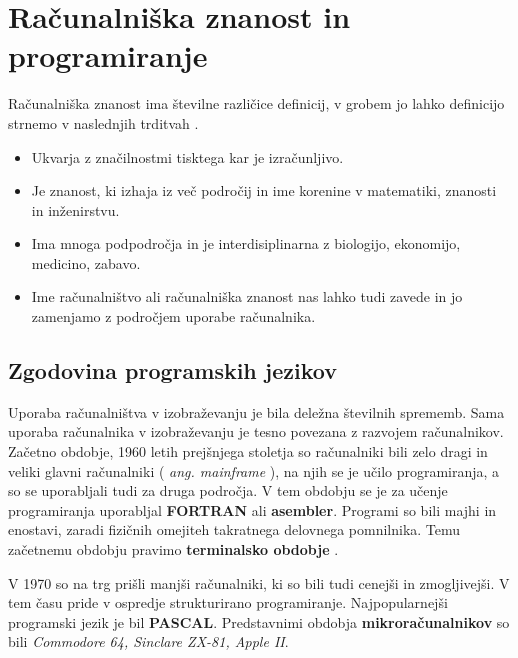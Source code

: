 \section{Računalniška znanost in programiranje}
\label{sec:računalniška_znanost_in_programiranje}

Računalniška znanost ima številne različice definicij, v grobem jo
lahko definicijo strnemo v naslednjih trditvah \cite{guideTCS}.

\begin{itemize}
\tightlist
\item Ukvarja z značilnostmi tisktega kar je izračunljivo.
\item Je znanost, ki izhaja iz več področij in ime korenine v matematiki,
znanosti in inženirstvu.
\item Ima mnoga podpodročja in je interdisiplinarna z biologijo,
ekonomijo, medicino, zabavo.
\item Ime računalništvo ali računalniška znanost nas lahko tudi zavede in
jo zamenjamo z področjem uporabe računalnika.
\end{itemize}


\subsection{Zgodovina programskih jezikov}
\label{sec:zgodovina_programskih_jezikov}



Uporaba računalništva v izobraževanju je bila deležna številnih
sprememb. Sama uporaba računalnika v izobraževanju je tesno povezana z
razvojem računalnikov.  Začetno obdobje, 1960 letih prejšnjega
stoletja so računalniki bili zelo dragi in veliki glavni računalniki (
\emph{ang. mainframe} ), na njih se je učilo programiranja, a so se
uporabljali tudi za druga področja.  V tem obdobju se je za učenje
programiranja uporabljal \textbf{FORTRAN} ali
\textbf{asembler}. Programi so bili majhi in enostavi, zaradi fizičnih
omejiteh takratnega delovnega pomnilnika. Temu začetnemu obdobju pravimo
\textbf{terminalsko obdobje} \cite{gerlic_2000}.

V 1970 so na trg prišli manjši računalniki, ki so bili tudi cenejši in
zmogljivejši. V tem času pride v ospredje strukturirano programiranje.
Najpopularnejši programski jezik je bil \textbf{PASCAL}. Predstavnimi
obdobja \textbf{mikroračunalnikov} so bili \emph{Commodore 64,
  Sinclare ZX-81, Apple II}.

